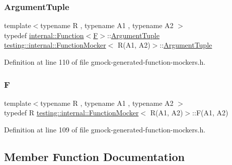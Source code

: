 \subsubsection{\texorpdfstring{Argument\+Tuple}{ArgumentTuple}}
{\footnotesize\ttfamily template$<$typename R , typename A1 , typename A2 $>$ \\
typedef \hyperlink{structtesting_1_1internal_1_1Function}{internal\+::\+Function}$<$\hyperlink{classtesting_1_1internal_1_1FunctionMocker_3_01R_07A1_00_01A2_08_4_a61302610bfc9b30588ea345e468310b2}{F}$>$\+::\hyperlink{classtesting_1_1internal_1_1FunctionMocker_3_01R_07A1_00_01A2_08_4_ae75e3ba40a99224f7363681914212c19}{Argument\+Tuple} \hyperlink{classtesting_1_1internal_1_1FunctionMocker}{testing\+::internal\+::\+Function\+Mocker}$<$ R(A1, A2)$>$\+::\hyperlink{classtesting_1_1internal_1_1FunctionMocker_3_01R_07A1_00_01A2_08_4_ae75e3ba40a99224f7363681914212c19}{Argument\+Tuple}}



Definition at line 110 of file gmock-\/generated-\/function-\/mockers.\+h.

\mbox{\label{classtesting_1_1internal_1_1FunctionMocker_3_01R_07A1_00_01A2_08_4_a61302610bfc9b30588ea345e468310b2}} 
\subsubsection{\texorpdfstring{F}{F}}
{\footnotesize\ttfamily template$<$typename R , typename A1 , typename A2 $>$ \\
typedef R \hyperlink{classtesting_1_1internal_1_1FunctionMocker}{testing\+::internal\+::\+Function\+Mocker}$<$ R(A1, A2)$>$\+::F(A1, A2)}



Definition at line 109 of file gmock-\/generated-\/function-\/mockers.\+h.



\subsection{Member Function Documentation}
\mbox{\label{classtesting_1_1internal_1_1FunctionMocker_3_01R_07A1_00_01A2_08_4_a518f5ac78887c64580343554aaae8f44}} 
